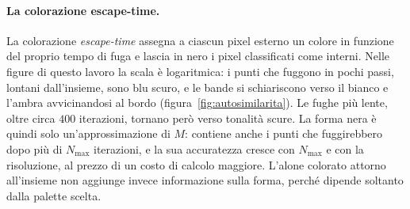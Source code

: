 \paragraph{La colorazione escape-time.} \label{work_load_visualization}
La colorazione \emph{escape-time} assegna a ciascun pixel esterno un colore in
funzione del proprio tempo di fuga e lascia in nero i pixel classificati come
interni. Nelle figure di questo lavoro la scala è logaritmica: i punti che
fuggono in pochi passi, lontani dall'insieme, sono blu scuro, e le bande si
schiariscono verso il bianco e l'ambra avvicinandosi al bordo
(figura~\ref{fig:autosimilarita}). Le fughe più lente, oltre circa $400$
iterazioni, tornano però verso tonalità scure. La forma nera è quindi solo
un'approssimazione di $M$: contiene anche i punti che fuggirebbero dopo più di
$N_{\max}$ iterazioni, e la sua accuratezza cresce con $N_{\max}$ e con la
risoluzione, al prezzo di un costo di calcolo maggiore. L'alone colorato attorno
all'insieme non aggiunge invece informazione sulla forma, perché dipende soltanto
dalla palette scelta.

